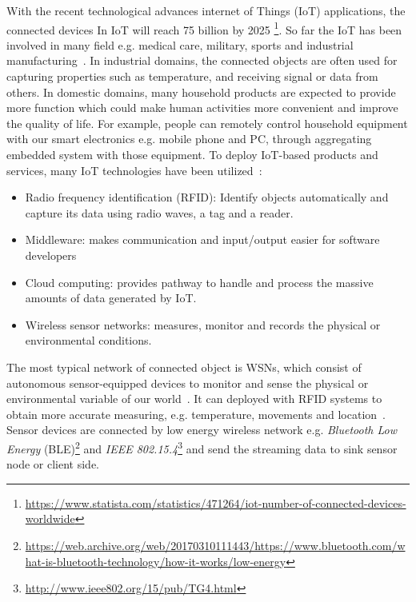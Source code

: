 With the recent technological advances internet of Things (IoT) applications,
the connected devices In IoT will reach 75 billion by 2025
\footnote{\url{https://www.statista.com/statistics/471264/iot-number-of-connected-devices-worldwide}}.
So far the IoT has been involved in many field e.g. medical care, military,
sports and industrial manufacturing~\cite{boudargham2017exhaustive,
lai2013survey, da2014internet}. In industrial domains, the connected objects are
often used for capturing properties such as temperature, and receiving signal or
data from others. In domestic domains, many household products are expected to
provide more function which could make human activities more convenient and
improve the quality of life. For example, people can remotely control household
equipment with our smart electronics e.g. mobile phone and PC, through
aggregating embedded system with those equipment.  To deploy IoT-based products
and services, many IoT technologies have been utilized~\cite{lee2015internet}:
\begin{itemize}
    \item Radio frequency identification (RFID): Identify objects automatically
    and capture its data using radio waves, a tag and a reader.
    \item Middleware: makes communication and input/output easier for software
    developers
    \item Cloud computing: provides pathway to handle and process the massive
    amounts of data generated by IoT.
    \item Wireless sensor networks: measures, monitor and records the physical
    or environmental conditions.
\end{itemize}

The most typical network of connected object is WSNs, which consist of
autonomous sensor-equipped devices to monitor and sense the physical or
environmental variable of our world~\cite{lee2015internet, li2016temporal}. It
can deployed with RFID systems to obtain more accurate measuring, e.g.
temperature, movements and location~\cite{lee2015internet, atzori2010b}. Sensor
devices are connected by low energy wireless network e.g.
\emph{Bluetooth Low Energy}
(BLE)\footnote{\url{https://web.archive.org/web/20170310111443/https://www.bluetooth.com/what-is-bluetooth-technology/how-it-works/low-energy}}
and \emph{IEEE 802.15.4}\footnote{\url{http://www.ieee802.org/15/pub/TG4.html}}
and send the streaming data to sink sensor node or client side.

